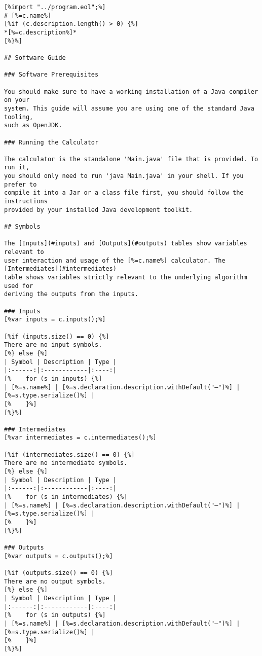 \documentclass[11pt,fleqn]{article}
\begin{document}
\begin{lstlisting}[caption={README Generation EGL},label={lst:readme-generation-egl}]
[%import "../program.eol";%]
# [%=c.name%]
[%if (c.description.length() > 0) {%]
*[%=c.description%]*
[%}%]

## Software Guide

### Software Prerequisites

You should make sure to have a working installation of a Java compiler on your
system. This guide will assume you are using one of the standard Java tooling,
such as OpenJDK.

### Running the Calculator

The calculator is the standalone 'Main.java' file that is provided. To run it,
you should only need to run 'java Main.java' in your shell. If you prefer to
compile it into a Jar or a class file first, you should follow the instructions
provided by your installed Java development toolkit.

## Symbols

The [Inputs](#inputs) and [Outputs](#outputs) tables show variables relevant to
user interaction and usage of the [%=c.name%] calculator. The [Intermediates](#intermediates)
table shows variables strictly relevant to the underlying algorithm used for
deriving the outputs from the inputs.

### Inputs
[%var inputs = c.inputs();%]

[%if (inputs.size() == 0) {%]
There are no input symbols.
[%} else {%]
| Symbol | Description | Type |
|:------:|:------------|:----:|
[%    for (s in inputs) {%]
| [%=s.name%] | [%=s.declaration.description.withDefault("—")%] | [%=s.type.serialize()%] |
[%    }%]
[%}%]

### Intermediates
[%var intermediates = c.intermediates();%]

[%if (intermediates.size() == 0) {%]
There are no intermediate symbols.
[%} else {%]
| Symbol | Description | Type |
|:------:|:------------|:----:|
[%    for (s in intermediates) {%]
| [%=s.name%] | [%=s.declaration.description.withDefault("—")%] | [%=s.type.serialize()%] |
[%    }%]
[%}%]

### Outputs
[%var outputs = c.outputs();%]

[%if (outputs.size() == 0) {%]
There are no output symbols.
[%} else {%]
| Symbol | Description | Type |
|:------:|:------------|:----:|
[%    for (s in outputs) {%]
| [%=s.name%] | [%=s.declaration.description.withDefault("—")%] | [%=s.type.serialize()%] |
[%    }%]
[%}%]


\end{lstlisting}
\end{document}
